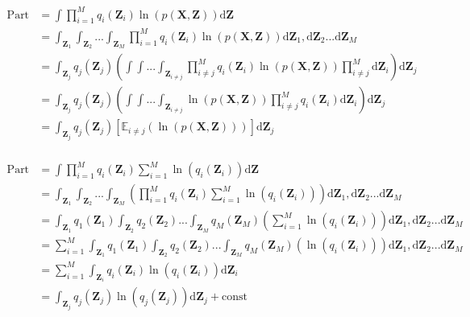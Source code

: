 \begin{displaymath}
\begin{split} 
\text{Part 1} &=  \int{ \prod_{i=1}^{M}{q_i(\mathbf{Z}_i)} \ln( p(\mathbf{X}, \mathbf{Z}))} \mathrm{d}\mathbf{Z}\\
&= \int_{\mathbf{Z}_1} \int_{\mathbf{Z}_2} \text{...} \int_{\mathbf{Z}_M} \prod_{i=1}^{M}{q_i(\mathbf{Z}_i)} \ln( p(\mathbf{X}, \mathbf{Z})) \mathrm{d}\mathbf{Z}_1, \mathrm{d}\mathbf{Z}_2 \text{...} \mathrm{d}\mathbf{Z}_M\\
&= \int_{\mathbf{Z}_j} q_j(\mathbf{Z}_j) \left ( \int \int \text{...} \int_{\mathbf{Z}_{i \neq j}} \prod_{i \neq j}^{M}{q_i(\mathbf{Z}_i)} \ln( p(\mathbf{X}, \mathbf{Z})) \prod_{i \neq j}^{M} \mathrm{d}\mathbf{Z}_i \right ) \mathrm{d} \mathbf{Z}_j\\
&= \int_{\mathbf{Z}_j} q_j(\mathbf{Z}_j) \left ( \int \int \text{...} \int_{\mathbf{Z}_{i \neq j}}  \ln( p(\mathbf{X}, \mathbf{Z})) \prod_{i \neq j}^{M}{q_i(\mathbf{Z}_i) \mathrm{d}\mathbf{Z}_i} \right ) \mathrm{d} \mathbf{Z}_j\\
&= \int_{\mathbf{Z}_j} q_j(\mathbf{Z}_j) \left [
\mathbb{E}_{i \neq j} \left (\ln (p(\mathbf{X}, \mathbf{Z})) \right)
 \right ] \mathrm{d} \mathbf{Z}_j\\
\end{split}
\end{displaymath}

\begin{displaymath}
\begin{split} 
\text{Part 2} &= \int{ \prod_{i=1}^{M}{q_i(\mathbf{Z}_i)} \sum_{i=1}^{M} \ln({q_i(\mathbf{Z}_i)})} \mathrm{d}\mathbf{Z}\\
&=\int_{\mathbf{Z}_1} \int_{\mathbf{Z}_2} \text{...} \int_{\mathbf{Z}_M} 
\left ( \prod_{i=1}^{M}{q_i(\mathbf{Z}_i)} \sum_{i=1}^{M} \ln({q_i(\mathbf{Z}_i)}) \right )
 \mathrm{d}\mathbf{Z}_1, \mathrm{d}\mathbf{Z}_2 \text{...} \mathrm{d}\mathbf{Z}_M\\
&=\int_{\mathbf{Z}_1} q_1(\mathbf{Z}_1) \int_{\mathbf{Z}_2} q_2(\mathbf{Z}_2) \text{...} \int_{\mathbf{Z}_M} q_M(\mathbf{Z}_M) 
\left ( \sum_{i=1}^{M} \ln({q_i(\mathbf{Z}_i)}) \right )
 \mathrm{d}\mathbf{Z}_1, \mathrm{d}\mathbf{Z}_2 \text{...} \mathrm{d}\mathbf{Z}_M\\
&=\sum_{i=1}^{M} \int_{\mathbf{Z}_1} q_1(\mathbf{Z}_1) \int_{\mathbf{Z}_2} q_2(\mathbf{Z}_2) \text{...} \int_{\mathbf{Z}_M} q_M(\mathbf{Z}_M) 
\left (  \ln({q_i(\mathbf{Z}_i)}) \right )
 \mathrm{d}\mathbf{Z}_1, \mathrm{d}\mathbf{Z}_2 \text{...} \mathrm{d}\mathbf{Z}_M\\
&=\sum_{i=1}^{M} \int_{\mathbf{Z}_i} q_i(\mathbf{Z}_i) \ln({q_i(\mathbf{Z}_i)}) \mathrm{d}\mathbf{Z}_i \\
&= \int_{\mathbf{Z}_j} q_j(\mathbf{Z}_j) \ln({q_j(\mathbf{Z}_j)}) \mathrm{d}\mathbf{Z}_j + \text{const}
\end{split}
\end{displaymath}


